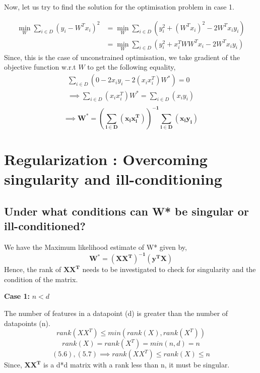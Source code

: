 \documentclass[11pt]{article}
\begin{document}
Now, let us try to find the solution for the optimisation problem in case 1.

\begin{equation*}
    \begin{aligned}
    \min_W \sum_{i \in D} (y_i - W^T x_i)^2 & = \min_W \sum_{i \in D} (y_i^2 + (W^T x_i)^2 - 2 W^T x_i y_i)\\
    &= \min_W \sum_{i \in D} (y_i^2 + x_i^TWW^Tx_i - 2 W^T x_i y_i)
    \end{aligned}
\end{equation*}
Since, this is the case of unconstrained optimisation, we take gradient of the objective function w.r.t $W$ to get the following equality,
\begin{equation*}
    \begin{aligned}
        \sum_{i \in D} ( 0 - 2x_iy_i - 2(x_ix_i^T)W^*) = 0 \\
        \implies \sum_{i \in D} (x_i x_i^T) W^* = \sum_{i \in D} (x_i y_i)\\
    \end{aligned}
\end{equation*}
\begin{equation}
        \mathbf{ \implies  W^* = (\sum_{i \in D} (x_i x_i^T))^{-1} \sum_{i \in D} (x_i y_i)}   
\end{equation}


\section{Regularization : Overcoming singularity and ill-conditioning }

\subsection{Under what conditions can W* be singular or ill-conditioned?}
We have the Maximum likelihood estimate of W* given by, 
$${\mathbf{W^* = (X X^T)^{-1}(y^T X)}}$$
Hence, the rank of ${\mathbf{X X^T}}$ needs to be investigated to check for singularity and the condition of the matrix.

\textbf{Case 1:} ${n < d}$

The number of features in a datapoint (d) is greater than the number of datapoints (n).
\begin{equation}
    rank(X X^T) \leq min(rank(X), rank(X^T))
\end{equation}
\begin{equation}
    rank(X) = rank(X^T) = min(n,d) = n 
\end{equation}
\begin{equation}
    (5.6), (5.7) \implies rank(X X^T) \leq rank(X) \leq n 
\end{equation}
Since, ${\mathbf{X X^T}}$ is a d*d matrix with a rank less than n, it must be singular.
\end{document}
